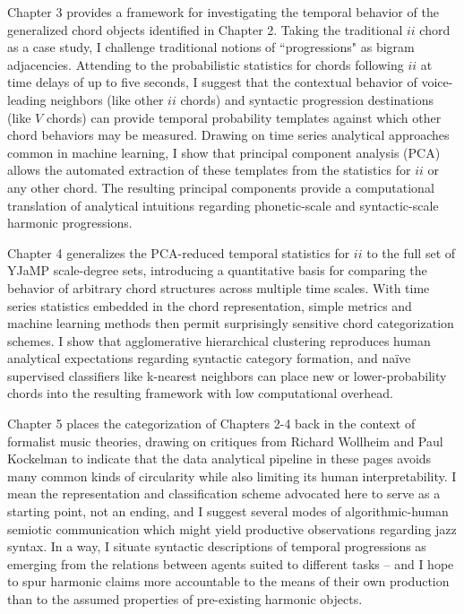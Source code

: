 Chapter 3 provides a framework for investigating the temporal behavior of the generalized chord objects identified in Chapter 2.  Taking the traditional $ii$ chord as a case study, I challenge traditional notions of ``progressions" as bigram adjacencies.  Attending to the probabilistic statistics for chords following $ii$ at time delays of up to five seconds, I suggest that the contextual behavior of voice-leading neighbors (like other $ii$ chords) and syntactic progression destinations (like $V$ chords) can provide temporal probability templates against which other chord behaviors may be measured.  Drawing on time series analytical approaches common in machine learning, I show that principal component analysis (PCA) allows the automated extraction of these templates from the statistics for $ii$ or any other chord.  The resulting principal components provide a computational translation of analytical intuitions regarding phonetic-scale and syntactic-scale harmonic progressions.

Chapter 4 generalizes the PCA-reduced temporal statistics for $ii$ to the full set of YJaMP scale-degree sets, introducing a quantitative basis for comparing the behavior of arbitrary chord structures across multiple time scales.  With time series statistics embedded in the chord representation, simple metrics and machine learning methods then permit surprisingly sensitive chord categorization schemes.  I show that agglomerative hierarchical clustering reproduces human analytical expectations regarding syntactic category formation, and na\"{i}ve supervised classifiers like k-nearest neighbors can place new or lower-probability chords into the resulting framework with low computational overhead.

Chapter 5 places the categorization of Chapters 2-4 back in the context of formalist music theories, drawing on critiques from Richard Wollheim and Paul Kockelman to indicate that the data analytical pipeline in these pages avoids many common kinds of circularity while also limiting its human interpretability.  I mean the representation and classification scheme advocated here to serve as a starting point, not an ending, and I suggest several modes of algorithmic-human semiotic communication which might yield productive observations regarding jazz syntax.  In a way, I situate syntactic descriptions of temporal progressions as emerging from the relations between agents suited to different tasks -- and I hope to spur harmonic claims more accountable to the means of their own production than to the assumed properties of pre-existing harmonic objects.